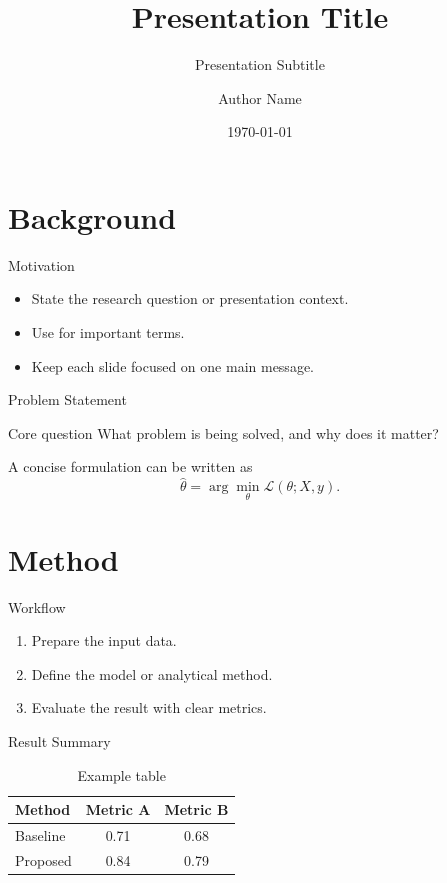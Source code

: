 \documentclass[aspectratio=169]{beamer}
\title[Short Title]{Presentation Title}
\subtitle{Presentation Subtitle}
\author[Author Name]{Author Name}
\institute[PKU SEE]{School of Environment and Energy, Peking University}
\date{\today}
\begin{document}
\PKUTitlePage
\PKUOutlineFrame

\section{Background}

\begin{frame}{Motivation}
  \begin{itemize}
    \item State the research question or presentation context.
    \item Use  for important terms.
    \item Keep each slide focused on one main message.
  \end{itemize}
\end{frame}

\begin{frame}{Problem Statement}
  \begin{block}{Core question}
    What problem is being solved, and why does it matter?
  \end{block}

  \vspace{0.35cm}

  A concise formulation can be written as
  \[
    \hat{\theta} = \arg\min_{\theta} \mathcal{L}(\theta; X, y).
  \]
\end{frame}

\section{Method}

\begin{frame}{Workflow}
  \begin{enumerate}
    \item Prepare the input data.
    \item Define the model or analytical method.
    \item Evaluate the result with clear metrics.
  \end{enumerate}
\end{frame}

\begin{frame}{Result Summary}
  \begin{table}
    \centering
    \caption{Example table}
    \begin{tabular}{lcc}
      \toprule
      Method & Metric A & Metric B \\
      \midrule
      Baseline & 0.71 & 0.68 \\
      Proposed & 0.84 & 0.79 \\
      \bottomrule
    \end{tabular}
  \end{table}
\end{frame}
\end{document}
